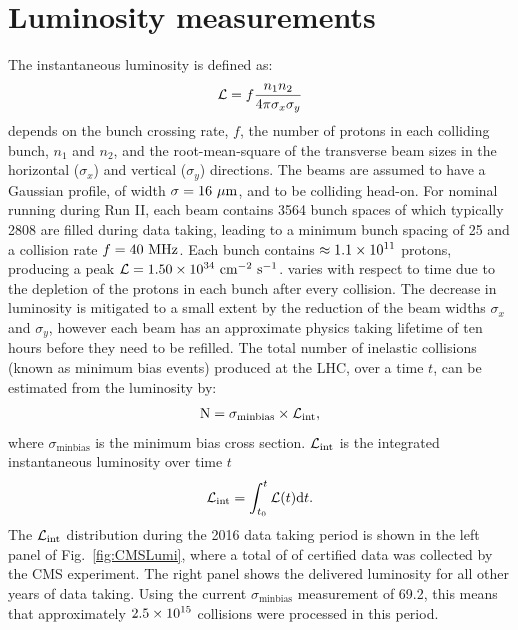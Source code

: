 \section{Luminosity measurements}
\label{sec:lumi}

The instantaneous luminosity is defined as:
\begin{equation}
\label{eq:InsLumi}
\mathcal{L} = f \frac{n_{1}n_{2}}{4\pi \sigma_{x} \sigma_{y}}
\end{equation}
\Lum{} depends on the bunch crossing rate, $f$, the number of protons in each colliding bunch, $n_{1}$ and $n_{2}$, and the root-mean-square of the transverse beam sizes in the horizontal ($\sigma_{x}$) and vertical ($\sigma_{y}$) directions. 
The beams are assumed to have a Gaussian profile, of width $\sigma=16\mathrm{~\mu m}^{}$, and to be colliding head-on.
For nominal running during Run II, each beam contains 3564 bunch spaces of which typically 2808 are filled during data taking, leading to a minimum bunch spacing of 25\ns{} and a collision rate $f=40\mathrm{~MHz}^{}$.
Each bunch contains $\approx 1.1\times \text{10}^\text{11}$ protons, producing a peak $\mathcal{L}=1.50\times \text{10}^\text{34}~\text{cm}^\text{$-$2}~\text{s}^\text{$-$1}$.
\Lum{} varies with respect to time due to the depletion of the protons in each bunch after every collision.
The decrease in luminosity is mitigated to a small extent by the reduction of the beam widths $\sigma_{x}$ and $\sigma_{y}$, however each beam has an approximate physics taking lifetime of ten hours before they need to be refilled.
The total number of inelastic collisions (known as minimum bias events) produced at the LHC, over a time $t$, can be estimated from the luminosity by:
\begin{equation}
\label{eq:nEvent}
\text{N} = \sigma_{\text{minbias}}\times\mathcal{L}_{\text{int}}, 
\end{equation}
where $\sigma_{\text{minbias}}$ is the minimum bias cross section.
$\mathcal{L}_{\text{int}}$ is the integrated instantaneous luminosity over time $t$
\begin{equation}
\label{eq:IntLumi}
\mathcal{L}_{\text{int}} = \int^{t}_{t_{0}}\mathcal{L}(t)\text{d}t.
\end{equation}
The $\mathcal{L}_{\text{int}}$ distribution during the 2016 data taking period is shown in the left panel of Fig.~\ref{fig:CMSLumi}, where a total of \Lumi{} of certified data was collected by the CMS experiment.
The right panel shows the delivered luminosity for all other years of data taking.
Using the current $\sigma_{\text{minbias}}$ measurement of 69.2\mb{}, this means that approximately $2.5\times \text{10}^\text{15}$ collisions were processed in this period.
